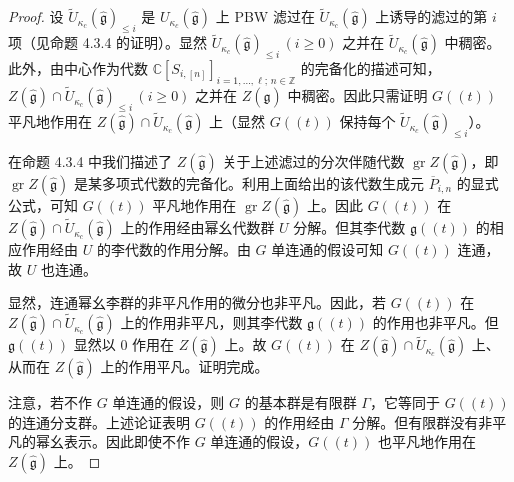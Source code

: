 \begin{proof}
设 $\widetilde{U}_{\kappa_c}(\hat{\mathfrak{g}})_{\le i}$ 是 $U_{\kappa_c}(\hat{\mathfrak{g}})$ 上 PBW 滤过在 $\widetilde{U}_{\kappa_c}(\hat{\mathfrak{g}})$ 上诱导的滤过的第 $i$ 项（见命题 4.3.4 的证明）。显然 $\widetilde{U}_{\kappa_c}(\hat{\mathfrak{g}})_{\le i}\,(i\ge0)$ 之并在 $\widetilde{U}_{\kappa_c}(\hat{\mathfrak{g}})$ 中稠密。此外，由中心作为代数 $\mathbb{C}[S_{i,[n]}]_{i=1,\dots,\ell;\,n\in\mathbb{Z}}$ 的完备化的描述可知，$Z(\hat{\mathfrak{g}})\cap\widetilde{U}_{\kappa_c}(\hat{\mathfrak{g}})_{\le i}\,(i\ge0)$ 之并在 $Z(\hat{\mathfrak{g}})$ 中稠密。因此只需证明 $G((t))$ 平凡地作用在 $Z(\hat{\mathfrak{g}})\cap\widetilde{U}_{\kappa_c}(\hat{\mathfrak{g}})$ 上（显然 $G((t))$ 保持每个 $\widetilde{U}_{\kappa_c}(\hat{\mathfrak{g}})_{\le i}$）。

在命题 4.3.4 中我们描述了 $Z(\hat{\mathfrak{g}})$ 关于上述滤过的分次伴随代数 $\operatorname{gr}Z(\hat{\mathfrak{g}})$，即 $\operatorname{gr}Z(\hat{\mathfrak{g}})$ 是某多项式代数的完备化。利用上面给出的该代数生成元 $\overline{P}_{i,n}$ 的显式公式，可知 $G((t))$ 平凡地作用在 $\operatorname{gr}Z(\hat{\mathfrak{g}})$ 上。因此 $G((t))$ 在 $Z(\hat{\mathfrak{g}})\cap\widetilde{U}_{\kappa_c}(\hat{\mathfrak{g}})$ 上的作用经由幂幺代数群 $U$ 分解。但其李代数 $\mathfrak{g}((t))$ 的相应作用经由 $U$ 的李代数的作用分解。由 $G$ 单连通的假设可知 $G((t))$ 连通，故 $U$ 也连通。

显然，连通幂幺李群的非平凡作用的微分也非平凡。因此，若 $G((t))$ 在 $Z(\hat{\mathfrak{g}})\cap\widetilde{U}_{\kappa_c}(\hat{\mathfrak{g}})$ 上的作用非平凡，则其李代数 $\mathfrak{g}((t))$ 的作用也非平凡。但 $\mathfrak{g}((t))$ 显然以 $0$ 作用在 $Z(\hat{\mathfrak{g}})$ 上。故 $G((t))$ 在 $Z(\hat{\mathfrak{g}})\cap\widetilde{U}_{\kappa_c}(\hat{\mathfrak{g}})$ 上、从而在 $Z(\hat{\mathfrak{g}})$ 上的作用平凡。证明完成。

注意，若不作 $G$ 单连通的假设，则 $G$ 的基本群是有限群 $\Gamma$，它等同于 $G((t))$ 的连通分支群。上述论证表明 $G((t))$ 的作用经由 $\Gamma$ 分解。但有限群没有非平凡的幂幺表示。因此即使不作 $G$ 单连通的假设，$G((t))$ 也平凡地作用在 $Z(\hat{\mathfrak{g}})$ 上。
\end{proof}

